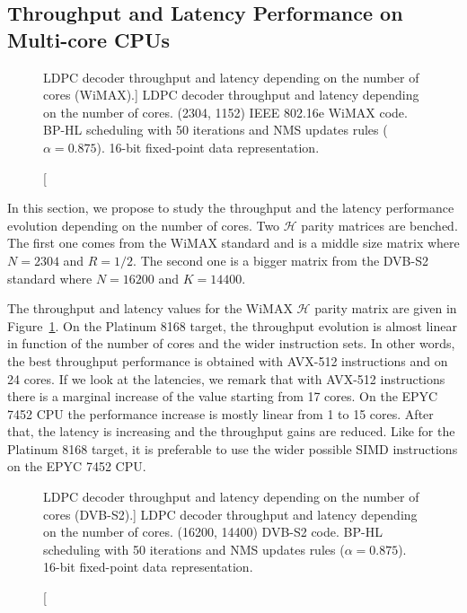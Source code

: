 \subsection{Throughput and Latency Performance on Multi-core CPUs}

\begin{figure}[htp]
  \centering
  \quad
  \caption
    [LDPC decoder throughput and latency depending on the number of cores (WiMAX).]
    {LDPC decoder throughput and latency depending on the number of cores.
    (2304, 1152) IEEE 802.16e WiMAX code. BP-HL scheduling with 50 iterations
    and NMS updates rules ($\alpha = 0.875$). 16-bit fixed-point data
    representation.}
  \label{plot:eval_ldpc_WiMAX_thr_lat}
\end{figure}

In this section, we propose to study the throughput and the latency performance
evolution depending on the number of cores. Two $\mathcal{H}$ parity matrices
are benched. The first one comes from the WiMAX standard and is a middle size
matrix where $N = 2304$ and $R = 1/2$. The second one is a bigger matrix from
the DVB-S2 standard where $N = 16200$ and $K = 14400$.

The throughput and latency values for the WiMAX $\mathcal{H}$ parity matrix are
given in Figure~\ref{plot:eval_ldpc_WiMAX_thr_lat}. On the Platinum 8168 target,
the throughput evolution is almost linear in function of the number of cores and
the wider instruction sets. In other words, the best throughput performance is
obtained with AVX-512 instructions and on 24 cores. If we look at the latencies,
we remark that with AVX-512 instructions there is a marginal increase of the
value starting from 17 cores. On the EPYC 7452 CPU the performance increase is
mostly linear from 1 to 15 cores. After that, the latency is increasing and the
throughput gains are reduced. Like for the Platinum 8168 target, it is
preferable to use the wider possible SIMD instructions on the EPYC 7452 CPU.

\begin{figure}[htp]
  \centering
  \quad
  \caption
    [LDPC decoder throughput and latency depending on the number of cores (DVB-S2).]
    {LDPC decoder throughput and latency depending on the number of cores.
    (16200, 14400) DVB-S2 code. BP-HL scheduling with 50 iterations and NMS
    updates rules ($\alpha = 0.875$). 16-bit fixed-point data representation.}
  \label{plot:eval_ldpc_DVB-S2_thr_lat}
\end{figure}

